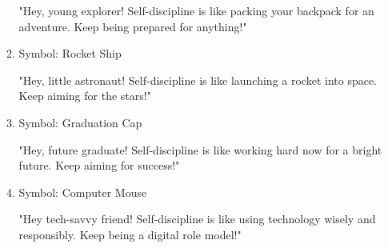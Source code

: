 \documentclass[14pt, letterpaper, twoside]{article}
\begin{document}
\begin{itemize}
\begin{enumerate}
		"Hey, young explorer! Self-discipline is like packing your backpack for an
		adventure. Keep being prepared for anything!"
		\item Symbol: Rocket Ship 
		
		"Hey, little astronaut! Self-discipline is like launching a rocket into space.
		Keep aiming for the stars!"
		\item Symbol: Graduation Cap 
		
		"Hey, future graduate! Self-discipline is like working hard now for a bright
		future. Keep aiming for success!"
		\item Symbol: Computer Mouse 
		
		"Hey tech-savvy friend! Self-discipline is like using technology wisely and
		responsibly. Keep being a digital role model!"
		\end{enumerate}
	\end{itemize}
\pagebreak
\end{document}
